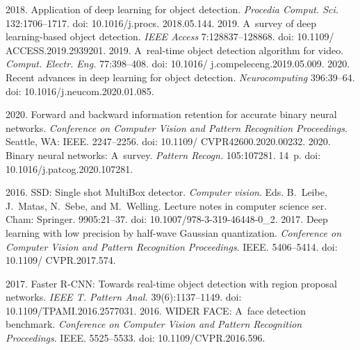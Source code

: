   \begin{multicols}{2}

\renewcommand{\bibname}{\protect\rmfamily References}

{\small\frenchspacing
 {%
 \begin{thebibliography}{99} 
 2018. Application of deep learning for 
object detection. \textit{Procedia Comput. Sci.} 132:1706--1717. doi: 10.1016/j.procs. 2018.05.144.
 2019. A~survey of deep 
learning-based object detection. \textit{IEEE Access} 7:128837--128868. doi: 
10.1109/ \mbox{ACCESS}.2019.2939201.
 2019. A~real-time object 
detection algorithm for video. \textit{Comput. Electr. Eng.} 77:398--408. doi: 
10.1016/ j.compeleceng.2019.05.009.
 2020. Recent advances in deep learning for object 
detection. \textit{Neurocomputing} 396:39--64. doi: 10.1016/j.neucom.2020.01.085.

 2020. Forward and 
backward information retention for accurate binary neural networks. \textit{Conference on 
Computer Vision and Pattern Recognition Proceedings}. Seattle, WA: IEEE. 2247--2256. doi: 
10.1109/ CVPR42600.2020.00232.
 2020. Binary neural networks: 
A~survey. \textit{Pattern Recogn.} 105:107281. 14~p. doi: 10.1016/j.patcog.2020.107281.

 2016. 
SSD: Single shot MultiBox detector. \textit{Computer vision}. Eds. 
B.~Leibe, J.~Matas, N.~Sebe, and M.~Welling. Lecture notes in computer science ser. Cham: 
Springer. 9905:21--37. doi: 10.1007/978-3-319-46448-0\_2.
 2017. Deep learning with low precision by 
half-wave Gaussian quantization. \textit{Conference on Computer Vision and Pattern 
Recognition Proceedings}. IEEE. 5406--5414.  doi: 10.1109/ CVPR.2017.574.

 2017. Faster R-CNN: Towards real-time object 
detection with region proposal networks. \textit{IEEE T. Pattern Anal.} 39(6):1137--1149. doi: 
10.1109/\mbox{TPAMI}.2016.2577031.
 2016. WIDER FACE: A~face detection 
benchmark. \textit{Conference on Computer Vision and Pattern Recognition Proceedings}. IEEE.
 5525--5533. doi: 10.1109/CVPR.2016.596.


\end{thebibliography}}}
\end{multicols}
